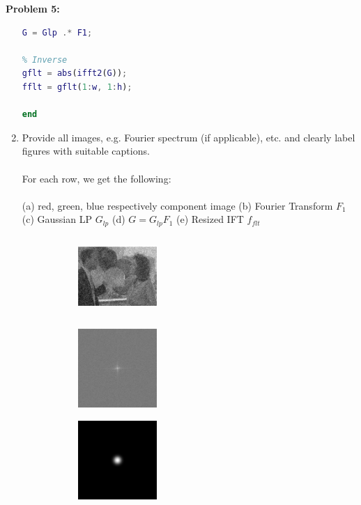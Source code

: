\documentclass[11pt]{article}
\newenvironment{problem}[1]{\textbf{Problem #1: }}{\newpage}
\begin{document}
\begin{problem}{5}
\begin{enumerate}[label = (\alph*)]
\begin{lstlisting}[language=Matlab]
% Multication of HF1
G = Glp .* F1;

% Inverse
gflt = abs(ifft2(G));
fflt = gflt(1:w, 1:h);

end
\end{lstlisting}
			\newpage
			\item Provide all images, e.g. Fourier spectrum (if applicable), etc. and clearly label figures with suitable captions.
			\\ \\
			For each row, we get the following: 
			\\ \\
			(a) red, green, blue respectively component image (b) Fourier Transform $F_1$ \\
			(c) Gaussian LP $G_{lp}$ (d) $G = G_{lp}F_1$ (e) Resized IFT $f_{flt}$
			\begin{figure}[h!]
				\centering
				\begin{subfigure}[h!]{.18\textwidth}
					\centering
					\includegraphics[height = 3cm, width = 3cm]{Figures/Prob5/Red/1}
					\caption{}
				\end{subfigure}
				\begin{subfigure}[h!]{.18\textwidth}
					\centering
					\includegraphics[height = 3cm, width = 3cm]{Figures/Prob5/Red/4}
					\caption{}
				\end{subfigure}
				\begin{subfigure}[h!]{.18\textwidth}
					\centering
					\includegraphics[height = 3cm, width = 3cm]{Figures/Prob5/Red/5}
					\caption{}
				\end{subfigure}

\end{figure}
\end{enumerate}
\end{problem}
\end{document}

